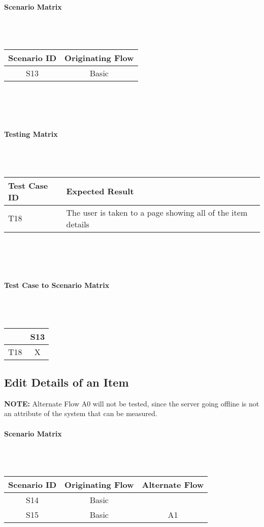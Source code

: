 \documentclass{article}
\begin{document}
\paragraph{Scenario Matrix}~\\ \\
\begin{tabular}{ c  c }
\hline
Scenario ID & Originating Flow\\
\hline
\hline
S13 & Basic\\
\hline
\end{tabular}\\
~\\
~\\
\paragraph{Testing Matrix}~\\ \\
\begin{tabular}{ p{0.8in}  p{3.4in} }
\hline
Test Case ID & Expected Result\\
\hline
\hline
T18 & The user is taken to a page showing all of the item details\\
\hline
\end{tabular}\\
~\\
~\\
\paragraph{Test Case to Scenario Matrix}~\\ \\
\begin{tabular}{ | c || c | }
\hline
    & S13 \\
\hline
\hline
T18 &  X  \\
\hline
\end{tabular}

\subsection{Edit Details of an Item}
\textbf{NOTE:} Alternate Flow A0 will not be tested, since the server going offline is not an attribute of the system that can be measured.
\paragraph{Scenario Matrix}~\\ \\
\begin{tabular}{ c  c  c }
\hline
Scenario ID & Originating Flow & Alternate Flow\\
\hline
\hline
S14 & Basic & \\
\hline
S15 & Basic & A1\\
\hline
\end{tabular}\\
~\\
~\\
\end{document}

